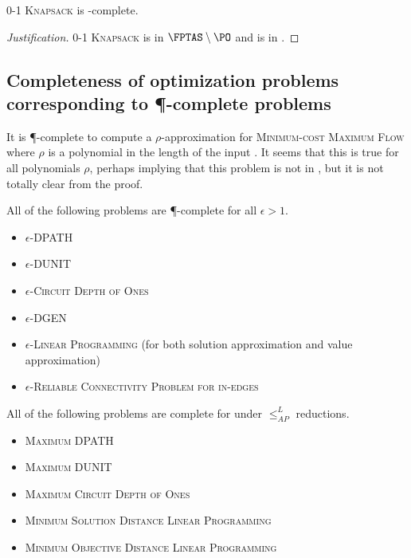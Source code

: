 \documentclass[]{article}
\newenvironment{justification}{\begin{proof}[Justification]}{\end{proof}}
\newcommand{\APr}{\leq_{AP}^{L}}
\begin{document}
\begin{conjecture}
  \textsc{0-1 Knapsack} is \FNCAS-complete.
\end{conjecture}
\begin{justification}
  \textsc{0-1 Knapsack} is in $\FPTAS\setminus\PO$ \cite[Section~3.2]{ep10} and is in \FNCAS{} \cite[Theorem~2]{mayr88}.
\end{justification}

\subsection{Completeness of optimization problems corresponding to \texorpdfstring{\P}{P}-complete problems}

It is \P-complete to compute a $\rho$-approximation for \textsc{Minimum-cost Maximum Flow} where $\rho$ is a polynomial in the length of the input \cite{sw92}.
It seems that this is true for all polynomials $\rho$, perhaps implying that this problem is not in \polyApxNCO{}, but it is not totally clear from the proof.

\begin{theorem}
  All of the following problems are \P-complete for all $\epsilon > 1$.
  \begin{itemize}
  \item \textsc{$\epsilon$-DPATH} \cite[Theorem~1]{ss89}
  \item \textsc{$\epsilon$-DUNIT} \cite[Theorem~2]{ss89}
  \item \textsc{$\epsilon$-Circuit Depth of Ones} \cite{kl88}
  \item \textsc{$\epsilon$-DGEN} \cite[Theorem~4]{ss89}
  \item \textsc{$\epsilon$-Linear Programming} (for both solution approximation and value approximation) \cite{serna91}
  \item \textsc{$\epsilon$-Reliable Connectivity Problem for in-edges} \cite[Theorem~4]{kks91}
  \end{itemize}
\end{theorem}

\begin{conjecture}
  All of the following problems are complete for \polyApxNCOp{} under $\APr$ reductions.
  \begin{itemize}
  \item \textsc{Maximum DPATH}
  \item \textsc{Maximum DUNIT}
  \item \textsc{Maximum Circuit Depth of Ones}
  \item \textsc{Minimum Solution Distance Linear Programming}
  \item \textsc{Minimum Objective Distance Linear Programming}
  \end{itemize}
\end{conjecture}
\end{document}
